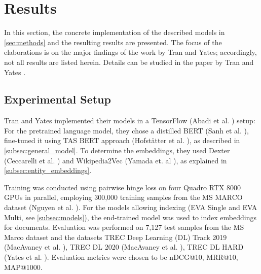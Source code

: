 \section{Results}\label{sec:results}

In this section, the concrete implementation of the described models in \autoref{sec:methods} and the resulting results are presented. The focus of the elaborations is on the major findings of the work by Tran and Yates; accordingly, not all results are listed herein. Details can be studied in the paper by Tran and Yates \cite{tran2022dense}.

\subsection{Experimental Setup}

Tran and Yates implemented their models in a TensorFlow (Abadi et al. \cite{abadi2016tensorflow}) setup: For the pretrained language model, they chose a distilled BERT (Sanh et al. \cite{sanh2019distilbert}), fine-tuned it using TAS BERT approach (Hofst{\"a}tter et al. \cite{tasbert}), as described in \autoref{subsec:general_model}. To determine the embeddings, they used Dexter (Ceccarelli et al. \cite{ceccarelli2013dexter}) and Wikipedia2Vec (Yamada et. al \cite{yamada2018wikipedia2vec}), as explained in \autoref{subsec:entity_embeddings}. 

Training was conducted using pairwise hinge loss on four Quadro RTX 8000 GPUs in parallel, employing 300,000 training samples from the MS MARCO dataset (Nguyen et al. \cite{nguyen2016ms}). For the models allowing indexing (EVA Single and EVA Multi, see \autoref{subsec:models}), the end-trained model was used to index embeddings for documents. Evaluation was performed on 7,127 test samples from the MS Marco dataset and the datasets TREC Deep Learning (DL) Track 2019 (MacAvaney et al. \cite{trec_dl_2019}), TREC DL 2020 (MacAvaney et al. \cite{trec_dl_2020}), TREC DL HARD (Yates et al. \cite{dl_hard}). Evaluation metrics were chosen to be nDCG@10, MRR@10, MAP@1000.

